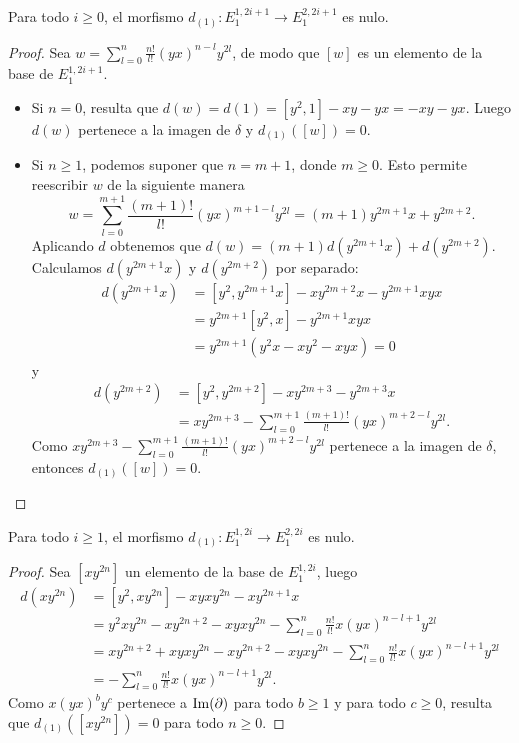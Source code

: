 \documentclass[fleqn,../tesis.tex]{subfiles}
\begin{document}
\begin{prop}
    Para todo $i \geq 0$, el morfismo $d_{(1)}: E^{1, 2i + 1}_{1} \to E^{2, 2i + 1}_{1}$ es nulo.
\end{prop}
\begin{proof}
Sea $w = \sum_{l = 0}^{n}\frac{n!}{l!}(yx)^{n - l}y^{2l}$, de modo que $[w]$ es un elemento de la base de $E^{1, 2i + 1}_{1}$.
\begin{itemize}
    \item Si $n = 0$, resulta que $d(w) = d(1) = \left[y^2, 1\right] - xy - yx = - xy - yx$. Luego $d(w)$ pertenece a la imagen de $\delta$ 
    y $d_{(1)}([w]) = 0$.
    \item Si $n \geq 1$, podemos suponer que $n = m + 1$, donde $m \geq 0$. Esto permite reescribir $w$ de la siguiente manera
    \[
        w = \sum_{l = 0}^{m + 1}\frac{(m + 1)!}{l!} (yx)^{m + 1 -l}y^{2l} = (m + 1)y^{2m + 1}x + y^{2m + 2}.
    \]
    Aplicando $d$ obtenemos que $d(w) = (m + 1)d\left(y^{2m + 1}x\right) + d\left(y^{2m + 2}\right)$.    
    Calculamos $d\left(y^{2m + 1}x\right)$ y $d\left(y^{2m + 2}\right)$ por separado:
    \begin{align*}
        d\left(y^{2m + 1}x\right) &= \left[y^{2}, y^{2m + 1}x\right] - xy^{2m + 2}x - y^{2m + 1}xyx \\
            &= y^{2m + 1}\left[y^{2}, x\right] - y^{2m + 1}xyx\\
        & = y^{2m + 1}\left(y^2x - xy^{2} - xyx\right) = 0
    \end{align*}
     y
     \begin{align*}
         d\left(y^{2m + 2}\right) &= \left[y^{2}, y^{2m + 2}\right] - xy^{2m + 3} - y^{2m + 3}x\\
         &= xy^{2m + 3} - \sum_{l =0}^{m + 1}\frac{(m + 1)!}{l!}(yx)^{m + 2 - l}y^{2l}.
     \end{align*}
     Como $xy^{2m + 3} - \sum_{l =0}^{m + 1}\frac{(m + 1)!}{l!}(yx)^{m + 2 - l}y^{2l}$ pertenece a la imagen de $\delta$,
     entonces $d_{(1)}([w]) = 0$.
\end{itemize}
\end{proof}


\begin{prop}
    Para todo $i \geq 1$, el morfismo $d_{(1)}: E^{1, 2i}_{1} \to E^{2, 2i}_{1}$ es nulo.
\end{prop}
\begin{proof}
Sea $\left[xy^{2n}\right]$ un elemento de la base de $E^{1, 2i}_{1}$, luego
\begin{align*}
    d(xy^{2n}) &= \left[y^{2}, xy^{2n}\right] - xyxy^{2n} - xy^{2n + 1}x \\
    &= y^{2}xy^{2n} - xy^{2n + 2} - xyxy^{2n} - \sum_{l = 0}^{n}\frac{n!}{l!}x(yx)^{n - l + 1}y^{2l} \\
    &= xy^{2n + 2} + xyxy^{2n} - xy^{2n + 2} - xyxy^{2n} - \sum_{l = 0}^{n}\frac{n!}{l!}x(yx)^{n - l + 1}y^{2l} \\
    &= -\sum_{l = 0}^{n}\frac{n!}{l!}x(yx)^{n - l + 1}y^{2l}.
\end{align*}
Como $x(yx)^{b}y^{c}$ pertenece a $\operatorname{Im}(\partial)$ para todo $b \geq 1$ y para todo $c \geq 0$, resulta que
$d_{(1)}(\left[xy^{2n}\right]) = 0$ para todo $n \geq 0$.
\end{proof}
\end{document}
